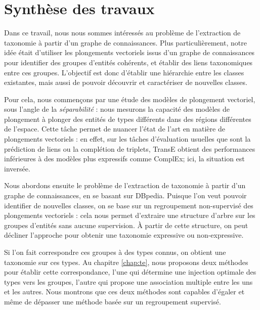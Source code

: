 \label{sec:Conclusion}




\section{Synthèse des travaux}


Dans ce travail, nous nous sommes intéressés au %
problème de l'extraction de taxonomie à partir d'un graphe de connaissances. Plus particulièrement, notre idée était d'utiliser les plongements vectoriels issus d'un graphe de connaissances pour identifier des groupes d'entités cohérents, et établir des liens taxonomiques entre ces groupes. L'objectif est donc d'établir une hiérarchie entre les classes existantes, mais aussi de pouvoir découvrir et caractériser de nouvelles classes. 

Pour cela, nous commençons par une étude des modèles de plongement vectoriel, sous l'angle de la \textit{séparabilité} : nous mesurons la capacité des modèles de plongement à plonger des entités de types différents dans des régions différentes de l'espace. %
%
Cette tâche permet de nuancer l'état de l'art en matière de plongements vectoriels : en effet, sur les tâches d'évaluation usuelles que sont la prédiction de liens ou la complétion de triplets, TransE obtient des performances inférieures à des modèles plus expressifs comme ComplEx; ici, la situation est inversée.


Nous abordons ensuite le problème de l'extraction de taxonomie à partir d'un graphe de connaissances, en se basant sur DBpedia. Puisque l'on veut pouvoir identifier de nouvelles classes, on se base sur un regroupement non-supervisé des plongements vectoriels : cela nous permet d'extraire une structure d'arbre sur les groupes d'entités sans aucune supervision. À partir de cette structure, on peut décliner l'approche pour obtenir une taxonomie expressive ou non-expressive.

Si l'on fait correspondre ces groupes à des types connus, on obtient une taxonomie sur ces types. Au chapitre \ref{chap:te}, nous proposons deux méthodes pour établir cette correspondance, l'une qui détermine une injection optimale des types vers les groupes, l'autre qui propose une association multiple entre les uns et les autres. Nous montrons que ces deux méthodes sont capables d'égaler et même de dépasser une méthode basée sur un regroupement supervisé.

